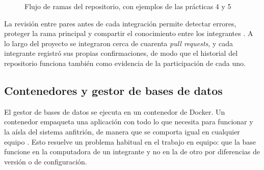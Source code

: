 \begin{figure}[H]
    \centering
    \captionsetup{labelfont=bf, textfont=it, labelsep=newline, justification=raggedright, singlelinecheck=false}
    \caption{Flujo de ramas del repositorio, con ejemplos de las prácticas 4 y 5}
    \label{fig:flujo-ramas}
\end{figure}

La revisión entre pares antes de cada integración permite detectar errores, proteger la rama principal y compartir el conocimiento entre los integrantes \parencite{github_pr_reviews}. A lo largo del proyecto se integraron cerca de cuarenta \textit{pull requests}, y cada integrante registró sus propias confirmaciones, de modo que el historial del repositorio funciona también como evidencia de la participación de cada uno.

\subsection{Contenedores y gestor de bases de datos}

El gestor de bases de datos se ejecuta en un contenedor de Docker. Un contenedor empaqueta una aplicación con todo lo que necesita para funcionar y la aísla del sistema anfitrión, de manera que se comporta igual en cualquier equipo \parencite{docker_what_is_container}. Esto resuelve un problema habitual en el trabajo en equipo: que la base funcione en la computadora de un integrante y no en la de otro por diferencias de versión o de configuración.

